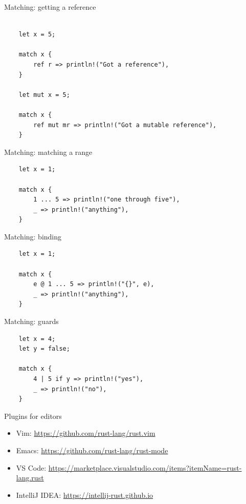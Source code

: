 \documentclass[12pt, aspectratio=169]{beamer}
\begin{document}
\begin{frame}[fragile]{Matching: getting a reference}
  \begin{verbatim}

    let x = 5;

    match x {
        ref r => println!("Got a reference"),
    }

    let mut x = 5;

    match x {
        ref mut mr => println!("Got a mutable reference"),
    }
  \end{verbatim}
\end{frame}

\begin{frame}[fragile]{Matching: matching a range}
  \begin{verbatim}
    let x = 1;

    match x {
        1 ... 5 => println!("one through five"),
        _ => println!("anything"),
    }
  \end{verbatim}
\end{frame}

\begin{frame}[fragile]{Matching: binding}
  \begin{verbatim}
    let x = 1;

    match x {
        e @ 1 ... 5 => println!("{}", e),
        _ => println!("anything"),
    }
  \end{verbatim}
\end{frame}

\begin{frame}[fragile]{Matching: guards}
  \begin{verbatim}
    let x = 4;
    let y = false;

    match x {
        4 | 5 if y => println!("yes"),
        _ => println!("no"),
    }
  \end{verbatim}
\end{frame}

\begin{frame}{Plugins for editors}
  \begin{itemize}
    \item Vim: \url{https://github.com/rust-lang/rust.vim}
    \item Emacs: \url{https://github.com/rust-lang/rust-mode}
    \item VS Code: \url{https://marketplace.visualstudio.com/items?itemName=rust-lang.rust}
    \item IntelliJ IDEA: \url{https://intellij-rust.github.io}
  \end{itemize}
\end{frame}
\end{document}
